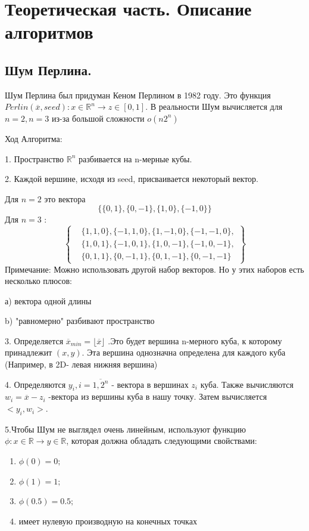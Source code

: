 \chapter{Теоретическая часть. Описание алгоритмов} 
\section{Шум Перлина.}
Шум Перлина был придуман Кеном Перлином в 1982 году. Это функция $Perlin(\overline{x},seed): x \in \mathbb{R}^n \rightarrow z\in [0,1]$. В реальности Шум вычисляется для $n=2, n=3$ из-за большой сложности $o(n  2^n)$

Ход Алгоритма:

1. Пространство $\mathbb{R}^n$ разбивается на n-мерные кубы.

2. Каждой вершине, исходя из seed, присваивается некоторый вектор. 

Для $n=2$ это вектора $$\{\{0,1\},\{0,-1\},\{1,0\},\{-1,0\}\}$$ Для $n=3$ : $$
\left\{
\begin{aligned}
&\{1,1,0\},\{-1,1,0\},\{1,-1,0\},\{-1,-1,0\},\\
&\{1,0,1\},\{-1,0,1\},\{1,0,-1\},\{-1,0,-1\},\\
&\{0,1,1\},\{0,-1,1\},\{0,1,-1\},\{0,-1,-1\}
\end{aligned}
\right\}
$$
Примечание: Можно использовать другой набор векторов. Но у этих наборов есть несколько плюсов:

а) вектора одной длины

b) "равномерно" разбивают пространство


3. Определяется $\overline{x}_{min}=\lfloor \overline{x} \rfloor$ .Это будет вершина n-мерного куба, к которому принадлежит $(x,y)$. Эта вершина однозначна определена для каждого куба (Например, в 2D- левая нижняя вершина)

4. Определяются $y_i, i=\overline{1,2^{n}}$ - вектора в вершинах $z_i$ куба. Также вычисляются $w_i=\overline{x}- z_i$ -вектора из  вершины куба в нашу точку. Затем вычисляется $<y_i,w_i>$.

5.Чтобы Шум не выглядел очень линейным,  используют функцию $\phi : x\in \mathbb{R} \rightarrow y \in \mathbb{R}$, которая должна обладать следующими свойствами:
\begin{enumerate}[label=\alph*)]
    \item $\phi(0)=0;$
    \item $\phi(1)=1;$
    \item $\phi(0.5)=0.5;$
    \item   имеет нулевую производную на конечных точках
\end{enumerate}

